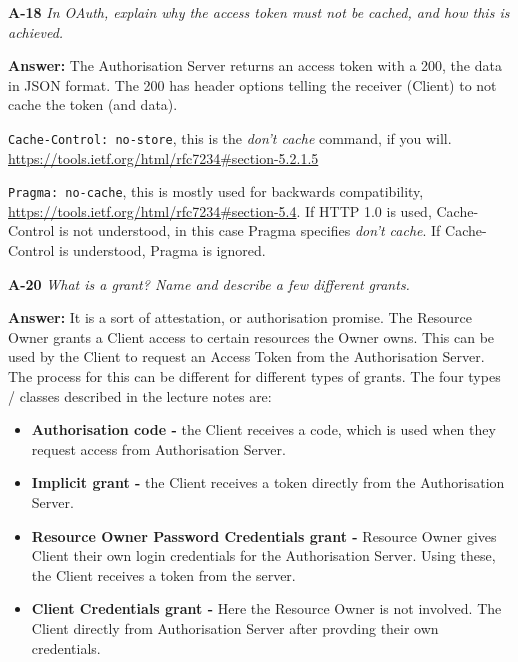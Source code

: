 \documentclass[a4paper]{article}
\newcommand{\Q}[2]{ \vspace{10pt} \textbf{A-#1} \textit{#2} }
\newcommand{\A}[1]{ \textbf{Answer:} #1 }
\begin{document}
\Q{18} { %
    In OAuth, explain why the access token must not be cached, and how this is 
    achieved.
}

\A{
    The Authorisation Server returns an access token with a 200,
    the data in JSON format. The 200 has header options
    telling the receiver (Client) to not cache the token (and data).

    \texttt{Cache-Control: no-store}, this is the \textit{don't cache}
    command, if you will. 
    \url{https://tools.ietf.org/html/rfc7234#section-5.2.1.5}

    \texttt{Pragma: no-cache}, this is mostly used for backwards 
    compatibility, \url{https://tools.ietf.org/html/rfc7234#section-5.4}.
    If HTTP 1.0 is used, Cache-Control is not understood,
    in this case Pragma specifies \textit{don't cache}. 
    If Cache-Control is understood, Pragma is ignored.

}

\Q{20} { %
    What is a grant? Name and describe a few different grants.
}

\A{
    It is a sort of attestation, or authorisation promise. 
    The Resource Owner grants a Client access to certain resources
    the Owner owns. This can be used by the Client to request
    an Access Token from the Authorisation Server.
    The process for this can be different for different types
    of grants. The four types / classes described in the lecture notes are:

    \begin{itemize}
        \item \textbf{Authorisation code - }
            the Client receives a code, which is used
            when they request access from Authorisation Server.
        \item \textbf{Implicit grant - }
            the Client receives a token directly from the Authorisation
            Server.
        \item \textbf{Resource Owner Password Credentials grant - }
            Resource Owner gives Client their own login credentials
            for the Authorisation Server. Using these, the Client 
            receives a token from the server.
        \item \textbf{Client Credentials grant - }
            Here the Resource Owner is not involved. The Client
            directly from Authorisation Server after provding
            their own credentials.
    \end{itemize}

}
\end{document}
